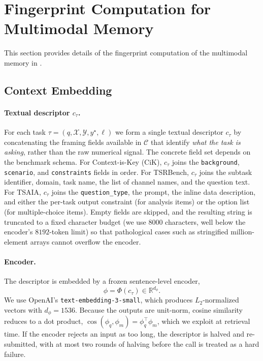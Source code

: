 \section{Fingerprint Computation for Multimodal Memory}
\label{ap:fingerprint}

This section provides details of the fingerprint computation of the multimodal memory in \method. 



\subsection{Context Embedding}
\label{app:phi}

\paragraph{Textual descriptor $c_\tau$.}
For each task $\tau = (q, \mathcal{X}, \mathcal{Y}, y^\star, \ell)$ we form a single textual descriptor $c_\tau$ by concatenating the framing
fields available in $\mathcal{C}$ that identify \emph{what the task is
asking}, rather than the raw numerical signal. The concrete field set
depends on the benchmark schema. For Context-is-Key (CiK), $c_\tau$
joins the \texttt{background}, \texttt{scenario}, and
\texttt{constraints} fields in order. For TSRBench, $c_\tau$ joins the
subtask identifier, domain, task name, the list of channel names, and
the question text. For TSAIA, $c_\tau$ joins the
\texttt{question\_type}, the prompt, the inline data description, and
either the per-task output constraint (for analysis items) or the
option list (for multiple-choice items). Empty fields are skipped, and
the resulting string is truncated to a fixed character budget (we use
$8000$ characters, well below the encoder's $8192$-token limit) so that
pathological cases such as stringified million-element arrays cannot
overflow the encoder.

\paragraph{Encoder.}
The descriptor is embedded by a frozen sentence-level encoder,
\begin{equation}
    \phi = \Phi(c_\tau) \in \mathbb{R}^{d_\phi}.
\end{equation}
We use OpenAI's \texttt{text-embedding-3-small}, which produces
$L_2$-normalized vectors with $d_\phi = 1536$. Because the outputs are
unit-norm, cosine similarity reduces to a dot product,
$\cos(\phi_q, \phi_m) = \phi_q^\top \phi_m$, which we exploit at
retrieval time. If the encoder rejects an input as too long, the
descriptor is halved and re-submitted, with at most two rounds of
halving before the call is treated as a hard failure.

